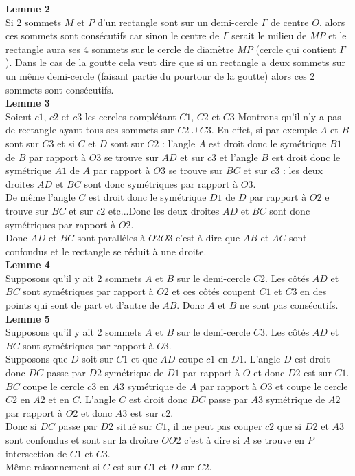 \documentclass[a4paper,11pt]{book}
\begin{document}
{\bf Lemme 2}\\
Si 2 sommets $M$ et $P$ d'un rectangle sont sur un demi-cercle $\Gamma$ de 
centre $O$, alors ces sommets sont cons\'ecutifs car sinon le centre de 
$\Gamma$ serait le milieu de $MP$ et le rectangle aura ses 4 sommets  sur le 
cercle de diam\`etre $MP$ (cercle qui contient $\Gamma$). Dans le cas de la 
goutte cela veut dire que si un rectangle a deux sommets sur un m\^eme 
demi-cercle (faisant partie du pourtour de la goutte) alors ces 2 sommets sont 
cons\'ecutifs.\\ 

{\bf Lemme 3}\\
Soient $c1$, $c2$ et $c3$ les cercles compl\'etant $C1$, $C2$ et $C3$
Montrons qu'il n'y a pas de rectangle ayant tous ses sommets sur $C2\cup C3$.
En effet, si par exemple $A$ et $B$ sont sur $C3$ et si $C$ et $D$ sont sur 
$C2$ : l'angle $A$ est droit donc le sym\'etrique $B1$ de $B$ par rapport \`a 
$O3$ se trouve sur $AD$ et sur $c3$ et l'angle $B$ est droit donc le 
sym\'etrique $A1$ de $A$ par rapport \`a $O3$ se trouve sur $BC$ et sur $c3$ : 
les deux droites $AD$ et $BC$ sont donc sym\'etriques par rapport \`a $O3$.\\
De m\^eme l'angle $C$ est droit donc le sym\'etrique $D1$ de $D$ par rapport 
\`a $O2$ e trouve sur $BC$ et sur $c2$ etc...Donc les deux droites $AD$ et $BC$
sont donc sym\'etriques par rapport \`a $O2$.\\
Donc $AD$ et $BC$ sont parall\'eles \`a $O2O3$ c'est \`a dire que $AB$ et $AC$ sont confondus et le rectangle se r\'eduit \`a une droite.\\

{\bf Lemme 4}\\
Supposons  qu'il y ait 2 sommets $A$ et $B$ sur le demi-cercle $C2$. Les 
c\^ot\'es $AD$ et $BC$ sont sym\'etriques par rapport \`a $O2$ et ces 
c\^ot\'es coupent $C1$ et $C3$ en des points qui sont de part et d'autre de 
$AB$. Donc $A$ et $B$ ne sont pas cons\'ecutifs.\\

{\bf Lemme 5}\\
Supposons  qu'il y ait 2 sommets $A$ et $B$ sur le demi-cercle $C3$. Les 
c\^ot\'es $AD$ et $BC$ sont sym\'etriques par rapport \`a $O3$.\\
Supposons que $D$ soit sur $C1$ et que $AD$ coupe $c1$ en 
$D1$. L'angle $D$ est droit donc $DC$ passe par $D2$ sym\'etrique de $D1$ par 
rapport \`a $O$ et donc $D2$ est sur $C1$.\\
$BC$ coupe le cercle $c3$ en $A3$ sym\'etrique de $A$ par rapport \`a $O3$ et 
coupe le cercle $C2$ en $A2$ et en $C$. L'angle $C$ est droit donc $DC$ passe 
par $A3$ sym\'etrique de $A2$ par rapport \`a $O2$ et donc $A3$ est sur $c2$.\\
Donc si $DC$ passe par $D2$ situ\'e sur $C1$, il ne peut pas couper $c2$ que si $D2$ et $A3$ sont confondus et sont sur la droitre $OO2$ c'est \`a dire si $A$ 
se trouve en $P$ intersection de $C1$ et $C3$.\\
M\^eme raisonnement si $C$ est sur $C1$ et $D$ sur $C2$.  
\end{document}

